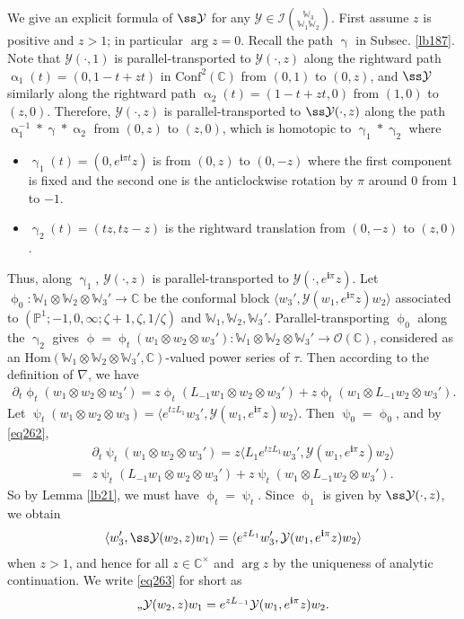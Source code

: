 \documentclass[11pt,b5paper,notitlepage]{article}
\theoremstyle{definition}
\theoremstyle{plain}
\newcommand{\mc}{\mathcal}
\newcommand{\Hom}{\mathrm{Hom}}
\newcommand{\Conf}{\mathrm{Conf}}
\newcommand{\bk}[1]{\langle {#1}\rangle}
\newcommand{\scr}{\mathscr}
\newcommand{\im}{\mathbf{i}}
\newcommand{\Wbb}{\mathbb W}
\newcommand{\Cbb}{\mathbb C}
\newcommand{\Pbb}{\mathbb P}
\numberwithin{equation}{section}
\begin{document}
\subsection{}

We give an explicit formula of $\ss\mc Y$ for any $\mc Y\in\mc I{\Wbb_3\choose\Wbb_1\Wbb_2}$. First assume $z$ is positive and $z>1$; in particular $\arg z=0$. Recall the path $\upgamma$ in Subsec. \ref{lb187}. Note that $\mc Y(\cdot, 1)$ is parallel-transported to $\mc Y(\cdot,z)$ along the rightward path $\upalpha_1(t)=(0,1-t+zt)$ in $\Conf^2(\Cbb)$ from $(0,1)$ to $(0,z)$, and $\ss\mc Y$ similarly along the rightward path $\upalpha_2(t)=(1-t+zt,0)$ from $(1,0)$ to $(z,0)$. Therefore, $\mc Y(\cdot,z)$ is parallel-transported to $\ss\mc Y(\cdot,z)$ along the path $\upalpha^{-1}_1*\upgamma*\upalpha_2$  from  $(0,z)$ to $(z,0)$, which is homotopic to $\upgamma_1*\upgamma_2$ where
\begin{itemize}
\item $\upgamma_1(t)=(0,e^{\im \pi t}z)$ is from $(0,z)$ to $(0,-z)$ where the first component is fixed and the second one is the anticlockwise rotation by $\pi$ around $0$ from $1$ to $-1$.
\item $\upgamma_2(t)=(tz,tz-z)$ is the rightward translation from $(0,-z)$ to $(z,0)$.
\end{itemize}
Thus, along $\upgamma_1$, $\mc Y(\cdot,z)$ is parallel-transported to $\mc Y(\cdot,e^{\im\pi}z)$. Let $\upphi_0:\Wbb_1\otimes\Wbb_2\otimes\Wbb_3'\rightarrow\Cbb$ be the conformal block $\bk{w_3',\mc Y(w_1,e^{\im\pi}z)w_2}$ associated to $(\Pbb^1;-1,0,\infty;\zeta+1,\zeta,1/\zeta)$ and $\Wbb_1,\Wbb_2,\Wbb_3'$. Parallel-transporting $\upphi_0$ along the  $\upgamma_2$  gives $\upphi=\upphi_t(w_1\otimes w_2\otimes w_3'):\Wbb_1\otimes\Wbb_2\otimes\Wbb_3'\rightarrow\scr O(\Cbb)$, considered as an $\Hom(\Wbb_1\otimes\Wbb_2\otimes\Wbb_3',\Cbb)$-valued power series of $\tau$. Then according to the definition of $\nabla$, we have
\begin{align*}
\partial_t\upphi_t(w_1\otimes w_2\otimes w_3')=z\upphi_t(L_{-1}w_1\otimes w_2\otimes w_3')+z\upphi_t(w_1\otimes L_{-1}w_2\otimes w_3').
\end{align*}
Let $\uppsi_t(w_1\otimes w_2\otimes w_3)=\bk{e^{tz L_1}w_3',\mc Y(w_1,e^{\im\pi}z)w_2}$. Then $\uppsi_0=\upphi_0$, and by \eqref{eq262},
\begin{align*}
&\partial_t\uppsi_t(w_1\otimes w_2\otimes w_3')=z\bk{L_1e^{tz L_1}w_3',\mc Y(w_1,e^{\im\pi}z)w_2}\\
=&z\uppsi_t(L_{-1}w_1\otimes w_2\otimes w_3')+z\uppsi_t(w_1\otimes L_{-1}w_2\otimes w_3').
\end{align*}
So by Lemma \ref{lb21}, we must have $\upphi_t=\uppsi_t$. Since $\upphi_1$ is given by $\ss\mc Y(\cdot,z)$, we obtain
\begin{align}
\bk{w_3',\ss\mc Y(w_2,z)w_1}=\bk{e^{zL_1}w_3',\mc Y(w_1,e^{\im\pi}z)w_2}\label{eq263}
\end{align}
when $z>1$, and hence for all $z\in\Cbb^\times$ and $\arg z$ by the uniqueness of analytic continuation. We write \eqref{eq263} for short as
\begin{align}
\ss\mc Y(w_2,z)w_1=e^{zL_{-1}}\mc Y(w_1,e^{\im\pi}z)w_2.\label{eq265}
\end{align} 
\end{document}
